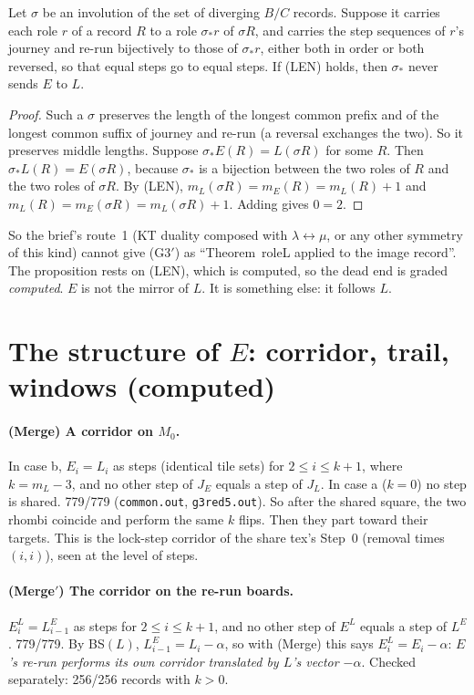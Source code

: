 \documentclass[11pt]{article}
\theoremstyle{definition}\newtheorem{definition}[theorem]{Definition}\newtheorem{remark}[theorem]{Remark}
\begin{document}
\begin{proposition}\label{prop:nosym}
Let $\sigma$ be an involution of the set of diverging $B/C$ records. Suppose it carries each role $r$ of a record $R$ to a role $\sigma_*r$ of $\sigma R$, and carries the step sequences of $r$'s journey and re-run bijectively to those of $\sigma_*r$, either both in order or both reversed, so that equal steps go to equal steps. If (LEN) holds, then $\sigma_*$ never sends $E$ to $L$.
\end{proposition}
\begin{proof}
Such a $\sigma$ preserves the length of the longest common prefix and of the longest common suffix of journey and re-run (a reversal exchanges the two). So it preserves middle lengths. Suppose $\sigma_*E(R)=L(\sigma R)$ for some $R$. Then $\sigma_*L(R)=E(\sigma R)$, because $\sigma_*$ is a bijection between the two roles of $R$ and the two roles of $\sigma R$. By (LEN), $m_L(\sigma R)=m_E(R)=m_L(R)+1$ and $m_L(R)=m_E(\sigma R)=m_L(\sigma R)+1$. Adding gives $0=2$.
\end{proof}
\noindent So the brief's route~1 (KT duality composed with $\lambda\leftrightarrow\mu$, or any other symmetry of this kind) cannot give (G3$'$) as ``Theorem~roleL applied to the image record''. The proposition rests on (LEN), which is computed, so the dead end is graded \emph{computed}. $E$ is not the mirror of $L$. It is something else: it follows $L$.

\section{The structure of $E$: corridor, trail, windows (computed)}\label{sec:struct}
\paragraph{(Merge) A corridor on $M_0$.} In case b, $E_i=L_i$ as steps (identical tile sets) for $2\le i\le k+1$, where $k=m_L-3$, and no other step of $J_E$ equals a step of $J_L$. In case a ($k=0$) no step is shared. 779/779 (\texttt{common.out}, \texttt{g3red5.out}). So after the shared square, the two rhombi coincide and perform the same $k$ flips. Then they part toward their targets. This is the lock-step corridor of the share tex's Step~0 (removal times $(i,i)$), seen at the level of steps.
\paragraph{(Merge$'$) The corridor on the re-run boards.} $E^L_i=L^E_{i-1}$ as steps for $2\le i\le k+1$, and no other step of $E^L$ equals a step of $L^E$. 779/779. By BS$(L)$, $L^E_{i-1}=L_i-\alpha$, so with (Merge) this says $E^L_i=E_i-\alpha$: \emph{$E$'s re-run performs its own corridor translated by $L$'s vector $-\alpha$}. Checked separately: 256/256 records with $k>0$.
\end{document}
